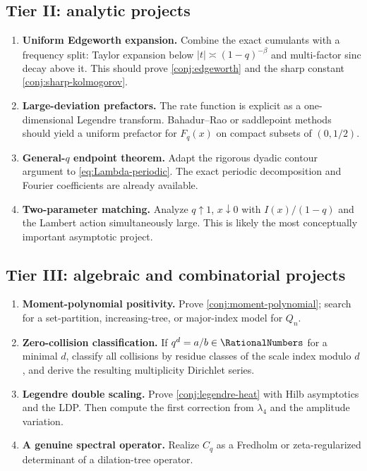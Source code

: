 \documentclass[11pt,oneside]{article}
\theoremstyle{definition}
\theoremstyle{remark}
\begin{document}
\subsection{Tier II: analytic projects}

\begin{enumerate}
  \item \textbf{Uniform Edgeworth expansion.}  Combine the exact cumulants with a frequency split: Taylor expansion below $|t|\asymp(1-q)^{-\beta}$ and multi-factor sinc decay above it.  This should prove \cref{conj:edgeworth} and the sharp constant \cref{conj:sharp-kolmogorov}.
  \item \textbf{Large-deviation prefactors.}  The rate function is explicit as a one-dimensional Legendre transform.  Bahadur--Rao or saddlepoint methods should yield a uniform prefactor for $F_q(x)$ on compact subsets of $(0,1/2)$.
  \item \textbf{General-$q$ endpoint theorem.}  Adapt the rigorous dyadic contour argument to \cref{eq:Lambda-periodic}.  The exact periodic decomposition and Fourier coefficients are already available.
  \item \textbf{Two-parameter matching.}  Analyze $q\uparrow1$, $x\downarrow0$ with $I(x)/(1-q)$ and the Lambert action simultaneously large.  This is likely the most conceptually important asymptotic project.
\end{enumerate}

\subsection{Tier III: algebraic and combinatorial projects}

\begin{enumerate}
  \item \textbf{Moment-polynomial positivity.}  Prove \cref{conj:moment-polynomial}; search for a set-partition, increasing-tree, or major-index model for $Q_n$.
  \item \textbf{Zero-collision classification.}  If $q^d=a/b\in\RationalNumbers$ for a minimal $d$, classify all collisions by residue classes of the scale index modulo $d$, and derive the resulting multiplicity Dirichlet series.
  \item \textbf{Legendre double scaling.}  Prove \cref{conj:legendre-heat} with Hilb asymptotics and the LDP.  Then compute the first correction from $\lambda_4$ and the amplitude variation.
  \item \textbf{A genuine spectral operator.}  Realize $C_q$ as a Fredholm or zeta-regularized determinant of a dilation-tree operator.
\end{enumerate}
\end{document}
